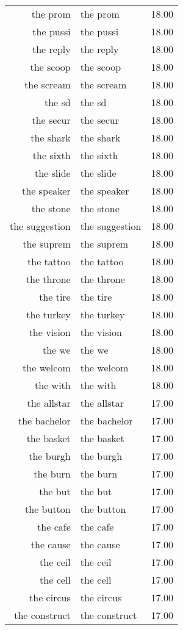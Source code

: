 \begin{table}[ht]
\begin{tabular}{rlr}
  the prom & the prom & 18.00 \\ 
  the pussi & the pussi & 18.00 \\ 
  the reply & the reply & 18.00 \\ 
  the scoop & the scoop & 18.00 \\ 
  the scream & the scream & 18.00 \\ 
  the sd & the sd & 18.00 \\ 
  the secur & the secur & 18.00 \\ 
  the shark & the shark & 18.00 \\ 
  the sixth & the sixth & 18.00 \\ 
  the slide & the slide & 18.00 \\ 
  the speaker & the speaker & 18.00 \\ 
  the stone & the stone & 18.00 \\ 
  the suggestion & the suggestion & 18.00 \\ 
  the suprem & the suprem & 18.00 \\ 
  the tattoo & the tattoo & 18.00 \\ 
  the throne & the throne & 18.00 \\ 
  the tire & the tire & 18.00 \\ 
  the turkey & the turkey & 18.00 \\ 
  the vision & the vision & 18.00 \\ 
  the we & the we & 18.00 \\ 
  the welcom & the welcom & 18.00 \\ 
  the with & the with & 18.00 \\ 
  the allstar & the allstar & 17.00 \\ 
  the bachelor & the bachelor & 17.00 \\ 
  the basket & the basket & 17.00 \\ 
  the burgh & the burgh & 17.00 \\ 
  the burn & the burn & 17.00 \\ 
  the but & the but & 17.00 \\ 
  the button & the button & 17.00 \\ 
  the cafe & the cafe & 17.00 \\ 
  the cause & the cause & 17.00 \\ 
  the ceil & the ceil & 17.00 \\ 
  the cell & the cell & 17.00 \\ 
  the circus & the circus & 17.00 \\ 
  the construct & the construct & 17.00 \\ 

\end{tabular}
\end{table}
